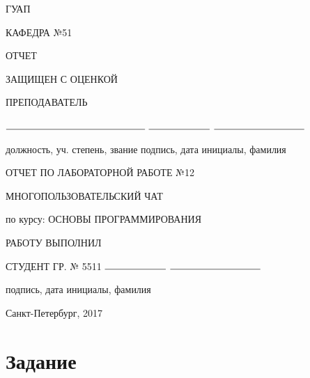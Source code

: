 \documentclass{article}
\begin{document}
\begin{titlepage}
	\begin{center}
    	ГУАП
    	\vspace{0.25cm}

    	КАФЕДРА №51
	\end{center}

    \begin{flushleft}

    	ОТЧЕТ

    	ЗАЩИЩЕН С ОЦЕНКОЙ

		ПРЕПОДАВАТЕЛЬ


    	\vspace{0.5cm}

		$\rule{5cm}{0.15mm}$ \hfill $\rule{2.2cm}{0.15mm}$  \hfill $\rule{3.25cm}{0.15mm}$

		должность, уч. степень, звание \hfill подпись, дата \hfill инициалы, фамилия
    \end{flushleft}

 	
    \hspace{2cm}

	\begin{center}
    	ОТЧЕТ ПО ЛАБОРАТОРНОЙ РАБОТЕ №12


    	\vspace{1cm}

        МНОГОПОЛЬЗОВАТЕЛЬСКИЙ ЧАТ


    	\vspace{1cm}

    	по курсу: ОСНОВЫ ПРОГРАММИРОВАНИЯ {\MakeUppercase{}}
    \end{center}

    \vspace{3cm}

    \begin{flushleft}
    	РАБОТУ ВЫПОЛНИЛ

    	СТУДЕНТ ГР. № 5511 \hfill $\rule{2.2cm}{0.15mm}$  \hfill $\rule{3.25cm}{0.15mm}$

    	\hspace{7.8cm} подпись, дата \hfill инициалы, фамилия
    \end{flushleft}

	\vspace{5cm}
	\begin{center}
 		Санкт-Петербург, 2017
	\end{center}
\end{titlepage}

\section{Задание}
\end{document}
